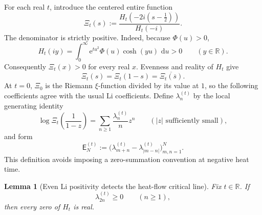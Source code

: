 \documentclass[11pt]{amsart}
\numberwithin{equation}{section}
\theoremstyle{plain}
\newtheorem{lemma}[theorem]{Lemma}
\theoremstyle{definition}
\theoremstyle{remark}
\newcommand{\E}{\mathsf E}
\newcommand{\e}{\mathrm e}
\newcommand{\dd}{\,\mathrm d}
\begin{document}
For each real \(t\), introduce the centered entire function
\begin{equation}
\Xi_t(s):=
\frac{H_t\!\left(-2i(s-\tfrac12)\right)}{H_t(-i)}.
\label{eq:newman_Xit}
\end{equation}
The denominator is strictly positive.  Indeed, because \(\Phi(u)>0\),
\begin{equation}
H_t(iy)=\int_0^\infty \e^{tu^2}\Phi(u)\cosh(yu)\,\dd u>0
\qquad(y\in\mathbb R).
\label{eq:newman_imaginary_axis_positive}
\end{equation}
Consequently \(\Xi_t(x)>0\) for every real \(x\).  Evenness and reality of \(H_t\) give
\begin{equation}
\Xi_t(s)=\Xi_t(1-s)=\overline{\Xi_t(\overline s)}.
\label{eq:newman_Xit_symmetry}
\end{equation}
At \(t=0\), \(\Xi_0\) is the Riemann \(\xi\)-function divided by its value at \(1\), so the
following coefficients agree with the usual Li coefficients.  Define \(\lambda_n^{(t)}\) by the
local generating identity
\begin{equation}
\log \Xi_t\!\left(\frac1{1-z}\right)
=
\sum_{n\ge1}\frac{\lambda_n^{(t)}}{n}z^n
\qquad(|z|\text{ sufficiently small}),
\label{eq:newman_Li_generating}
\end{equation}
and form
\begin{equation}
\E_N^{(t)}
:=
\bigl(\lambda_{m+n}^{(t)}-\lambda_{|m-n|}^{(t)}\bigr)_{m,n=1}^N.
\label{eq:newman_Et}
\end{equation}
This definition avoids imposing a zero-summation convention at negative heat time.

\begin{lemma}[Even Li positivity detects the heat-flow critical line]
\label{lem:newman_pringsheim_even}
Fix \(t\in\mathbb R\).  If
\begin{equation}
\lambda_{2n}^{(t)}\ge0\qquad(n\ge1),
\label{eq:newman_even_nonnegative}
\end{equation}
then every zero of \(H_t\) is real.
\end{lemma}
\end{document}
